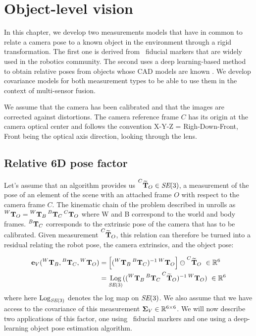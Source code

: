 \chapter{Object-level vision}
\label{chp:object_level}
\minitoc

In this chapter, we develop two measurements models that have in common to relate a camera pose to a known object in the environment through a rigid transformation. The first one 
is derived from \apriltag\ fiducial markers \cite{wang2016iros} that are widely used in the robotics community. The second uses a deep learning-based method
to obtain relative poses from objects whose CAD models are known \cite{labbe2020cosypose}. We develop covariance models for both
measurement types to be able to use them in the context of multi-sensor fusion.

We assume that the camera has been calibrated and that the images are corrected against distortions. The camera reference frame $C$ has its origin at 
the camera optical center and follows the convention X-Y-Z = Righ-Down-Front, Front being the optical axis direction, looking through the lens.

\section{Relative 6D pose factor}
Let's assume that an algorithm provides us $\prescript{C}{}{\widetilde{{\bf T}}}_{O} \in \textit{SE}(3)$, a measurement of the pose of an element 
of the scene with an attached frame $O$ with respect to the camera frame $C$.
The kinematic chain of the problem described in  unrolls as 
$\prescript{W}{}{{\bf T}}_{O} = \prescript{W}{}{{\bf T}}_{B}\prescript{B}{}{{\bf T}}_{C}\prescript{C}{}{{\bf T}}_{O}$ where W and B correspond to the world and body frames. $\prescript{B}{}{{\bf T}}_{C}$ corresponds to the extrinsic pose 
of the camera that has to be calibrated.
Given measurement $\prescript{C}{}{\widetilde{{\bf T}}}_{O}$, this relation can therefore be turned into a residual relating 
the robot pose, the camera extrinsics, and the object pose:

\begin{align}
    {\bf e}_V (\prescript{W}{}{{\bf T}}_{B}, \prescript{B}{}{{\bf T}}_{C}, \prescript{W}{}{{\bf T}}_{O}) 
    &= \left[ (\prescript{W}{}{{\bf T}}_{B}\prescript{B}{}{{\bf T}}_{C})^{-1}\prescript{W}{}{{\bf T}}_{O} \right] \ominus \prescript{C}{}{\widetilde{{\bf T}}}_{O} ~ \in \mathbb{R}^6 \\
    &= \operatorname*{Log}_{\textit{SE}(3)} ( (\prescript{W}{}{{\bf T}}_{B} \prescript{B}{}{{\bf T}}_{C} \prescript{C}{}{\widetilde{{\bf T}}}_{O})^{-1} \prescript{W}{}{{\bf T}}_{O}) ~ \in \mathbb{R}^6
\end{align}
%
where here $\operatorname*{Log}_{\textit{SE}(3)}$ denotes the log map on $\textit{SE}(3)$.
We also assume that we have access to the covariance of this measurement 
\mbox{${\bm \Sigma}_V \in \mathbb{R}^{6 \times 6}$}. We will now describe two applications of this factor, one using \apriltag\ fiducial markers and one using 
a deep-learning object pose estimation algorithm.

